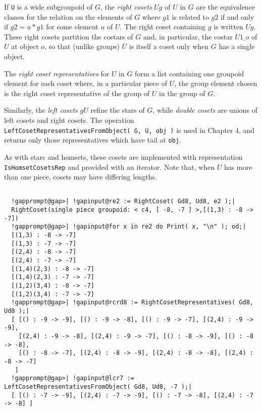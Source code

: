 \documentclass[a4paper,11pt]{report}
\begin{document}
{{{ If \texttt{U} is a wide subgroupoid of $G$, the \emph{right cosets} $Ug$ of $U$ in $G$ are the equivalence classes for the relation on the elements of $G$ where $g1$ is related to $g2$ if and only if $g2 = u*g1$ for some element $u$ of $U$. The right coset containing $g$ is written $Ug$. These right cosets partition the costars of $G$ and, in particular, the costar $U1\_{o}$ of $U$ at object $o$, so that (unlike groups) $U$ is itself a coset only when $G$ has a single object. 

 The \emph{right coset representatives} for $U$ in $G$ form a list containing one groupoid element for each coset where, in a
particular piece of $U$, the group element chosen is the right coset representative of the group of $U$ in the group of $G$. 

 Similarly, the \emph{left cosets} $gU$ refine the stars of $G$, while \emph{double cosets} are unions of left cosets and right cosets. The operation \texttt{LeftCosetRepresentativesFromObject( G, U, obj )} is used in Chapter 4, and returns only those representatives which have tail
at \texttt{obj}. 

 As with stars and homsets, these cosets are implemented with representation \texttt{IsHomsetCosetsRep} and provided with an iterator. Note that, when $U$ has more than one piece, cosets may have differing lengths. 

 }

 
\begin{Verbatim}[commandchars=!@|,fontsize=\small,frame=single,label=Example]
  
  !gapprompt@gap>| !gapinput@re2 := RightCoset( Gd8, Ud8, e2 );|
  RightCoset(single piece groupoid: < c4, [ -8, -7 ] >,[(1,3) : -8 -> -7])
  !gapprompt@gap>| !gapinput@for x in re2 do Print( x, "\n" ); od;|
  [(1,3) : -8 -> -7]
  [(1,3) : -7 -> -7]
  [(2,4) : -8 -> -7]
  [(2,4) : -7 -> -7]
  [(1,4)(2,3) : -8 -> -7]
  [(1,4)(2,3) : -7 -> -7]
  [(1,2)(3,4) : -8 -> -7]
  [(1,2)(3,4) : -7 -> -7]
  !gapprompt@gap>| !gapinput@rcrd8 := RightCosetRepresentatives( Gd8, Ud8 );|
  [ [() : -9 -> -9], [() : -9 -> -8], [() : -9 -> -7], [(2,4) : -9 -> -9],
    [(2,4) : -9 -> -8], [(2,4) : -9 -> -7], [() : -8 -> -9], [() : -8 -> -8],
    [() : -8 -> -7], [(2,4) : -8 -> -9], [(2,4) : -8 -> -8], [(2,4) : -8 -> -7]
   ]
  !gapprompt@gap>| !gapinput@lcr7 := LeftCosetRepresentativesFromObject( Gd8, Ud8, -7 );|
  [ [() : -7 -> -9], [(2,4) : -7 -> -9], [() : -7 -> -8], [(2,4) : -7 -> -8] ]
  
\end{Verbatim}
 }

}
\end{document}
